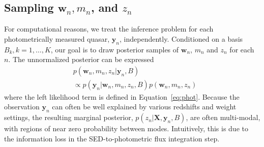 \documentclass{article}
\begin{document}

\subsection{Sampling $\mathbf{w}_n, m_n$, and $z_n$}
For computational reasons, we treat the inference problem for each photometrically measured quasar, $\mathbf{y}_n$, independently.
Conditioned on a basis~${B_k, k=1,\dots, K}$, our goal is to draw posterior samples of $\mathbf{w}_n$, $m_n$ and $z_n$ for each $n$.  
The unnormalized posterior can be expressed
\begin{align}
  &p(\mathbf{w}_n, m_n, z_n | \mathbf{y}_n, B) \\
  &\propto p(\mathbf{y}_n | \mathbf{w}_n, m_n, z_n, B) p(\mathbf{w}_n, m_n, z_n) \end{align}
where the left likelihood term is defined in Equation~\ref{eq:phot}.
Because the observation $\mathbf{y}_n$ can often be well explained by various redshifts and weight settings, the resulting marginal posterior, $p(z_n | \mathbf{X}, \mathbf{y}_n, B)$, are often multi-modal, with regions of near zero probability between modes.
Intuitively, this is due to the information loss in the SED-to-photometric flux integration step.
\end{document}
